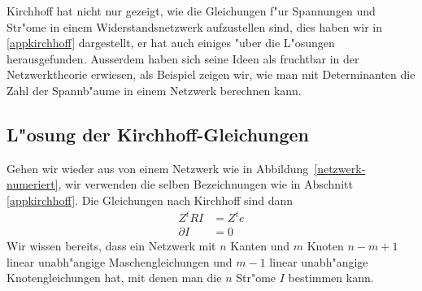 %
%
Kirchhoff hat nicht nur gezeigt, wie die Gleichungen f"ur Spannungen
und Str"ome in einem Widerstandsnetzwerk aufzustellen sind, dies
haben wir in \ref{appkirchhoff} dargestellt, er hat
auch einiges "uber die L"osungen herausgefunden.
Ausserdem haben sich seine Ideen als fruchtbar in der Netzwerktheorie
erwiesen, als Beispiel zeigen wir, wie man mit Determinanten die
Zahl der Spannb"aume in einem Netzwerk berechnen kann.

\subsection{L"osung der Kirchhoff-Gleichungen}
Gehen wir wieder aus von einem Netzwerk wie in
Abbildung~\ref{netzwerk-numeriert}, wir verwenden die selben 
Bezeichnungen wie in Abschnitt \ref{appkirchhoff}.
Die Gleichungen nach Kirchhoff sind dann
\begin{align*}
Z^tRI&=Z^te \tag{Maschengleichungen}\\
\partial I&=0 \tag{Knotengleichungen}
\end{align*}
Wir wissen bereits, dass ein Netzwerk mit $n$ Kanten und $m$
Knoten $n-m+1$ linear unabh"angige Maschengleichungen und
$m-1$ linear unabh"angige Knotengleichungen hat, mit denen man
die $n$ Str"ome $I$ bestimmen kann.

